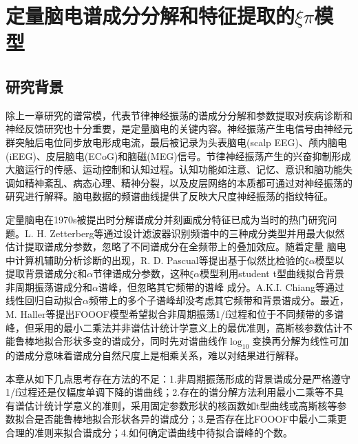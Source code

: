 \chapter{定量脑电谱成分分解和特征提取的\texorpdfstring{$\xi\pi$}{ξπ}模型}
\section{研究背景}
除上一章研究的谱常模，代表节律神经振荡的谱成分分解和参数提取对疾病诊断和神经反馈研究也十分重要，是定量脑电的关键内容。神经振荡产生电信号由神经元群突触后电位同步放电形成电流，最后被记录为头表脑电(scalp EEG)、颅内脑电(iEEG)、皮层脑电(ECoG)和脑磁(MEG)信号。节律神经振荡产生的兴奋抑制形成大脑运行的传感、运动控制和认知过程。认知功能如注意、记忆、意识和脑功能失调如精神紊乱、病态心理、精神分裂，以及皮层网络的本质都可通过对神经振荡的研究进行解释。脑电数据的频谱曲线提供了反映大尺度神经振荡的指纹特征。

定量脑电在1970s被提出时分解谱成分并刻画成分特征已成为当时的热门研究问题。L. H. Zetterberg等通过设计滤波器识别频谱中的三种成分类型并用最大似然估计提取谱成分参数，忽略了不同谱成分在全频带上的叠加效应。随着定量
脑电中计算机辅助分析诊断的出现，R. D. Pascual等提出基于似然比检验的$\xi\alpha$模型以提取背景谱成分$\xi$和$\alpha$节律谱成分参数，这种$\xi\alpha$模型利用student t型曲线拟合背景非周期振荡谱成分和$\alpha$谱峰，但忽略其它频带的谱峰
成分。A.K.I. Chiang等通过线性回归自动拟合$\alpha$频带上的多个子谱峰却没考虑其它频带和背景谱成分。最近，M. Haller等提出FOOOF模型希望拟合非周期振荡1/f过程和位于不同频带的多谱峰，但采用的最小二乘法并非谱估计统计学意义上的最优准则，高斯核参数估计不能鲁棒地拟合形状多变的谱成分，同时先对谱曲线作$\log_{10}$变换再分解为线性可加的谱成分意味着谱成分自然尺度上是相乘关系，难以对结果进行解释。

本章从如下几点思考存在方法的不足：1.非周期振荡形成的背景谱成分是严格遵守1/f过程还是仅幅度单调下降的谱曲线；2.存在的谱分解方法利用最小二乘等不具有谱估计统计学意义的准则，采用固定参数形状的核函数如t型曲线或高斯核等参数拟合是否能鲁棒地拟合形状各异的谱成分；3.是否存在比FOOOF中最小二乘更合理的准则来拟合谱成分；4.如何确定谱曲线中待拟合谱峰的个数。

